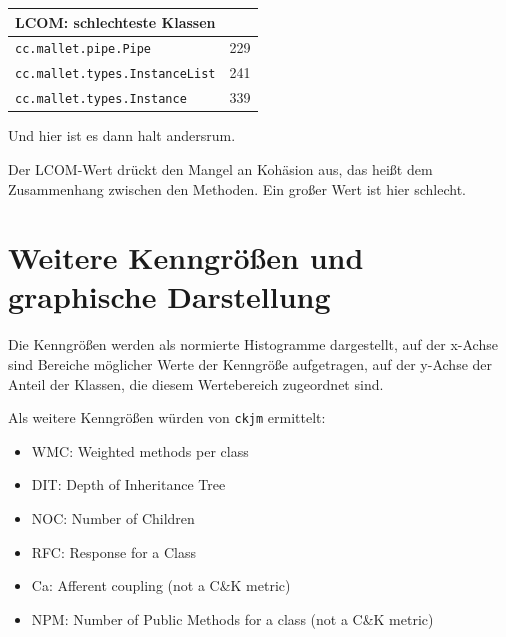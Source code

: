 \documentclass{scrreprt}
\newcommand{\lstx}[1]{\lstinline$#1$}
\begin{document}
\begin{center}
\end{center}


\begin{center}
\begin{tabular}{ll}
\toprule
LCOM: schlechteste Klassen \\
\midrule
\lstx{cc.mallet.pipe.Pipe} & 229\\
\lstx{cc.mallet.types.InstanceList} & 241\\
\lstx{cc.mallet.types.Instance} & 339 \\
\bottomrule
\end{tabular}
\end{center}

Und hier ist es dann halt andersrum.

Der LCOM-Wert drückt den Mangel an Kohäsion aus, das heißt dem Zusammenhang zwischen den Methoden. Ein großer Wert ist hier schlecht.

\section{Weitere Kenngrößen und graphische Darstellung}


Die Kenngrößen werden als normierte Histogramme dargestellt, auf der x-Achse sind Bereiche möglicher Werte der Kenngröße aufgetragen, auf der y-Achse der Anteil der Klassen, die diesem Wertebereich zugeordnet sind.

Als weitere Kenngrößen würden von \lstx{ckjm} ermittelt:

\begin{itemize}
\item WMC: Weighted methods per class
\item DIT: Depth of Inheritance Tree
\item NOC: Number of Children
\item RFC: Response for a Class
\item Ca: Afferent coupling (not a C\&K metric)
\item NPM: Number of Public Methods for a class (not a C\&K metric)
\end{itemize}
\end{document}
